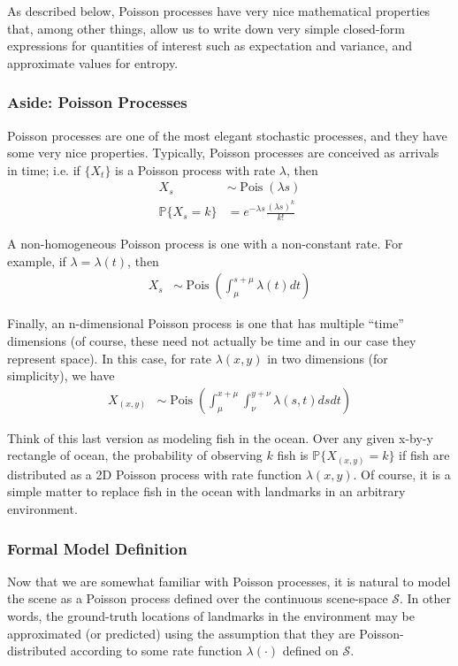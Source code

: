 \documentclass[12pt]{article}
\DeclareMathOperator{\Pois}{Pois}
\begin{document}
As described below, Poisson processes have very nice mathematical properties that, among other things, allow us to write down very simple closed-form expressions for quantities of interest such as expectation and variance, and approximate values for entropy.

\subsubsection{Aside: Poisson Processes}

Poisson processes are one of the most elegant stochastic processes, and they have some very nice properties. Typically, Poisson processes are conceived as arrivals in time; i.e. if $\{X_t\}$ is a Poisson process with rate $\lambda$, then
\begin{align}
  X_s &\sim \Pois(\lambda s) \\
  \mathbb{P}\{X_s = k\} &= e^{-\lambda s}\frac{(\lambda s)^k}{k!}
\end{align}

A non-homogeneous Poisson process is one with a non-constant rate. For example, if $\lambda = \lambda(t)$, then
\begin{align}
  X_s &\sim \Pois \left( \int_{\mu}^{s + \mu} \lambda(t) dt \right)
\end{align}

Finally, an n-dimensional Poisson process is one that has multiple ``time'' dimensions (of course, these need not actually be time and in our case they represent space). In this case, for rate $\lambda(x, y)$ in two dimensions (for simplicity), we have
\begin{align}
  X_{(x, y)} &\sim \Pois \left( \int_{\mu}^{x + \mu} \int_{\nu}^{y + \nu} \lambda(s, t) ds dt \right)
\end{align}

Think of this last version as modeling fish in the ocean. Over any given x-by-y rectangle of ocean, the probability of observing $k$ fish is $\mathbb{P}\{X_{(x, y)} = k\}$ if fish are distributed as a 2D Poisson process with rate function $\lambda(x, y)$. Of course, it is a simple matter to replace fish in the ocean with landmarks in an arbitrary environment.

\subsubsection{Formal Model Definition}

Now that we are somewhat familiar with Poisson processes, it is natural to model the scene as a Poisson process defined over the continuous scene-space $\mathcal{S}$. In other words, the ground-truth locations of landmarks in the environment may be approximated (or predicted) using the assumption that they are Poisson-distributed according to some rate function $\lambda(\cdot)$ defined on $\mathcal{S}$.
\end{document}

